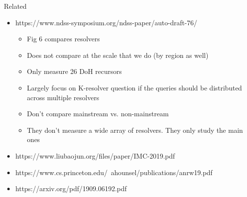 Related
\begin{itemize}
    \item https://www.ndss-symposium.org/ndss-paper/auto-draft-76/
    \begin{itemize}
        \item Fig 6 compares resolvers
	    \item Does not compare at the scale that we do (by region as well)
	    \item Only measure 26 DoH recursors
	    \item Largely focus on K-resolver question if the queries should be distributed across multiple resolvers
	    \item Don't compare mainstream vs. non-mainstream
	    \item They don't measure a wide array of resolvers. They only study the main ones
    \end{itemize}
    \item https://www.liubaojun.org/files/paper/IMC-2019.pdf
    \item https://www.cs.princeton.edu/~ahounsel/publications/anrw19.pdf
    \item https://arxiv.org/pdf/1909.06192.pdf
\end{itemize}
